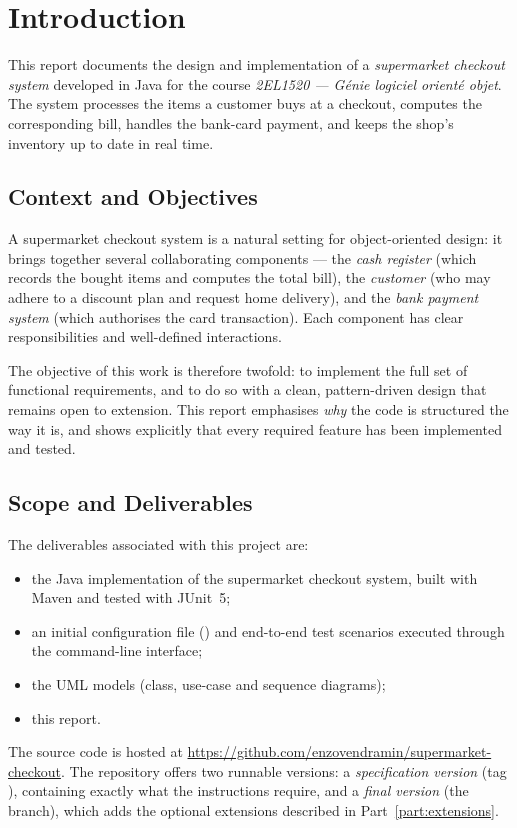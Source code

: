\chapter{Introduction}
\label{ch:introduction}

This report documents the design and implementation of a \emph{supermarket
checkout system} developed in Java for the course \emph{2EL1520 --- Génie
logiciel orienté objet}. The system processes the items a customer buys at a
checkout, computes the corresponding bill, handles the bank-card payment, and
keeps the shop's inventory up to date in real time.

\section{Context and Objectives}
A supermarket checkout system is a natural setting for object-oriented design:
it brings together several collaborating components --- the \emph{cash register}
(which records the bought items and computes the total bill), the
\emph{customer} (who may adhere to a discount plan and request home delivery),
and the \emph{bank payment system} (which authorises the card transaction). Each
component has clear responsibilities and well-defined interactions.

The objective of this work is therefore twofold: to implement the full set of
functional requirements, and to do so with a clean, pattern-driven design that
remains open to extension. This report emphasises \emph{why} the code is
structured the way it is, and shows explicitly that every required feature has
been implemented and tested.

\section{Scope and Deliverables}
The deliverables associated with this project are:
\begin{itemize}[nosep]
  \item the Java implementation of the supermarket checkout system, built with
  Maven and tested with JUnit~5;
  \item an initial configuration file () and
  end-to-end test scenarios executed through the command-line interface;
  \item the UML models (class, use-case and sequence diagrams);
  \item this report.
\end{itemize}
The source code is hosted at
\url{https://github.com/enzovendramin/supermarket-checkout}. The repository
offers two runnable versions: a \emph{specification version} (tag ),
containing exactly what the instructions require, and a \emph{final version} (the
 branch), which adds the optional extensions described in
Part~\ref{part:extensions}.

